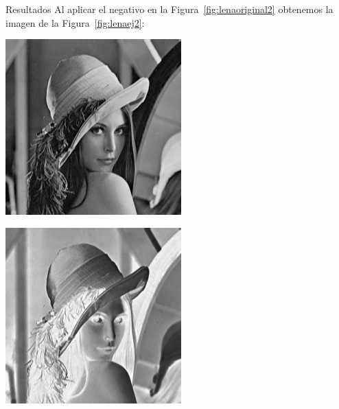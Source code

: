\documentclass{beamer}
\begin{document}
\begin{frame}[fragile]{Resultados}
	\justifying
	Al aplicar el negativo en la Figura~\ref{fig:lenaoriginal2} obtenemos la imagen de la Figura~\ref{fig:lenaej2}:
	\vspace{0.5cm}
	
	\centering
	\begin{minipage}{0.45\linewidth}
		\centering
		\includegraphics[width=\linewidth]{../results/lena_original}
		\label{fig:lenaoriginal2}
	\end{minipage}\hfill
	\begin{minipage}{0.45\linewidth}
		\centering
		\includegraphics[width=\linewidth]{../results/lena_ej2}
		\label{fig:lenaej2}
	\end{minipage}
\end{frame}
\end{document}
